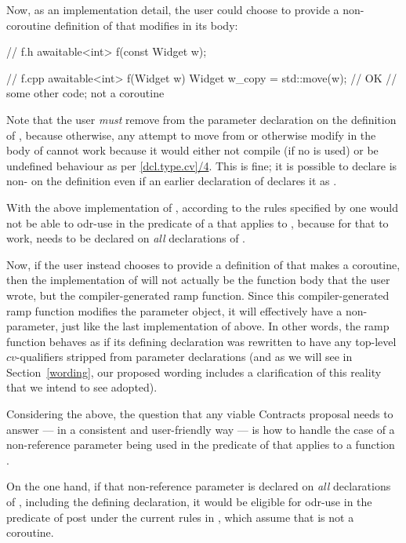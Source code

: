 Now, as an implementation detail, the user could choose to provide a non-coroutine definition of  that modifies  in its body:
\begin{codeblock}
// f.h
awaitable<int> f(const Widget w);

// f.cpp
awaitable<int> f(Widget w)
{
  Widget w_copy = std::move(w); // OK
  // some other code; not a coroutine
}
\end{codeblock}
Note that the user \emph{must} remove  from the parameter declaration on the definition of , because otherwise, any attempt to move from  or otherwise modify  in the body of  cannot work because it would either not compile (if no  is used) or be undefined behaviour as per \href{https://eel.is/c++draft/dcl.type.cv#4.sentence-1}{[dcl.type.cv]/4}. This is fine; it is possible to declare  is non- on the definition even if an earlier declaration of  declares it as .

With the above implementation of , according to the rules specified by \cite{P2900R8} one would not be able to odr-use  in the predicate of a  that applies to , because for that to work,  needs to be declared  on \emph{all} declarations of .

Now, if the user instead chooses to provide a definition of  that makes  a coroutine, then the implementation of  will not actually be the function body that the user wrote, but the compiler-generated ramp function. Since this compiler-generated ramp function modifies the parameter object, it will effectively have a non-  parameter, just like the last implementation of  above. In other words, the ramp function behaves as if its defining declaration was rewritten to have any top-level $cv$-qualifiers stripped from parameter declarations (and as we will see in Section~\ref{wording}, our proposed wording includes a clarification of this reality that we intend to see adopted).

Considering the above, the question that any viable Contracts proposal needs to answer --- in a consistent and user-friendly way --- is how to handle the case of a non-reference parameter being used in the predicate of  that applies to a function .

On the one hand, if that non-reference parameter is declared  on \emph{all} declarations of , including the defining declaration, it would be eligible for odr-use in the predicate of post under the current rules in \cite{P2900R8}, which assume that  is not a coroutine.

